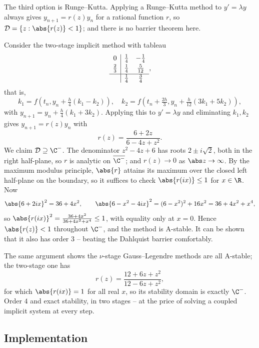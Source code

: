 The third option is Runge--Kutta. Applying a Runge--Kutta method to $y' = \lambda y$ always gives $y_{n+1} = r(z)y_n$ for a rational function $r$, so $\mathcal{D} = \{z : \abs{r(z)} < 1\}$; and there is no barrier theorem here.

\begin{example}
  Consider the two-stage implicit method with tableau
  $$
  \begin{array}{c|cc}
    0 & \tfrac14 & -\tfrac14\\[2pt]
    \tfrac23 & \tfrac14 & \tfrac{5}{12}\\[2pt]\hline
      & \tfrac14 & \tfrac34
  \end{array},
  $$
  that is,
  $$
  k_1 = f\left(t_n, y_n + \tfrac{h}{4}(k_1 - k_2)\right), \quad k_2 = f\left(t_n + \tfrac{2h}{3}, y_n + \tfrac{h}{12}(3k_1 + 5k_2)\right),
  $$
  with $y_{n+1} = y_n + \tfrac{h}{4}(k_1 + 3k_2)$. Applying this to $y' = \lambda y$ and eliminating $k_1, k_2$ gives $y_{n+1} = r(z)y_n$ with
  $$
  r(z) = \frac{6 + 2z}{6 - 4z + z^2}.
  $$
  We claim $\mathcal{D} \supseteq \C^-$. The denominator $z^2 - 4z + 6$ has roots $2 \pm i\sqrt 2$, both in the right half-plane, so $r$ is analytic on $\overline{\C^-}$; and $r(z) \to 0$ as $\abs z \to \infty$. By the maximum modulus principle, $\abs{r}$ attains its maximum over the closed left half-plane on the boundary, so it suffices to check $\abs{r(ix)} \leq 1$ for $x \in \R$. Now
  $$
  \abs{6 + 2ix}^2 = 36 + 4x^2, \qquad \abs{6 - x^2 - 4ix}^2 = (6-x^2)^2 + 16x^2 = 36 + 4x^2 + x^4,
  $$
  so $\abs{r(ix)}^2 = \frac{36+4x^2}{36+4x^2+x^4} \leq 1$, with equality only at $x = 0$. Hence $\abs{r(z)} < 1$ throughout $\C^-$, and the method is A-stable. It can be shown that it also has order $3$ -- beating the Dahlquist barrier comfortably.
\end{example}

\begin{remark}
  The same argument shows the $\nu$-stage Gauss--Legendre methods are all A-stable; the two-stage one has
  $$
  r(z) = \frac{12 + 6z + z^2}{12 - 6z + z^2},
  $$
  for which $\abs{r(ix)} = 1$ for all real $x$, so its stability domain is exactly $\C^-$. Order $4$ and exact stability, in two stages -- at the price of solving a coupled implicit system at every step.
\end{remark}

\subsection{Implementation}

